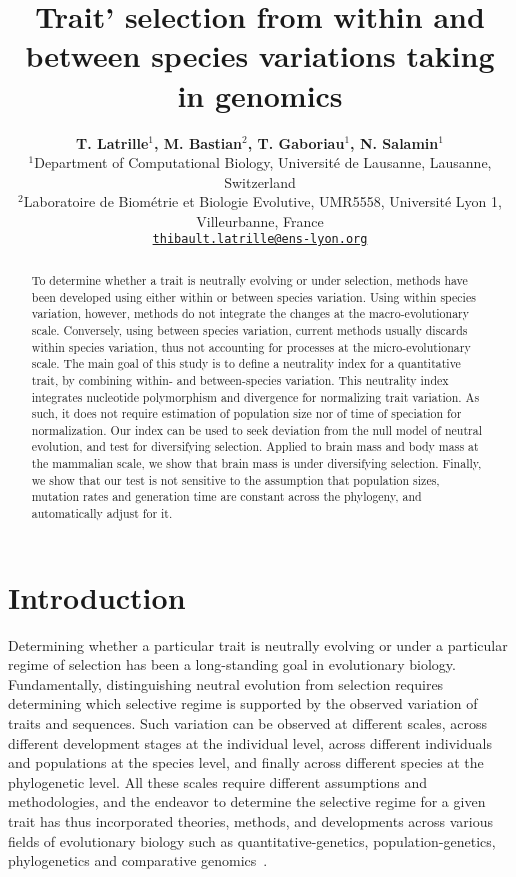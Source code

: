 \documentclass{article}
\title{Trait' selection from within and between species variations taking in genomics}
\author{
\large
\textbf{T. {Latrille}$^{1}$\orcidlink{0000-0002-9643-4668}, M. {Bastian}$^{2}$, T. {Gaboriau}$^{1}$\orcidlink{0000-0001-7530-2204}, N. {Salamin}$^{1}$\orcidlink{0000-0002-3963-4954}}\\
\normalsize
$^{1}$Department of Computational Biology, Université de Lausanne, Lausanne, Switzerland\\
$^{2}$Laboratoire de Biométrie et Biologie Evolutive, UMR5558, Université Lyon 1, Villeurbanne, France \\
\texttt{\href{mailto:thibault.latrille@ens-lyon.org}{thibault.latrille@ens-lyon.org}} \\
}
\begin{document}
\maketitle

\begin{abstract}
    To determine whether a trait is neutrally evolving or under selection, methods have been developed using either within or between species variation.
    Using within species variation, however, methods do not integrate the changes at the macro-evolutionary scale.
    Conversely, using between species variation, current methods usually discards within species variation, thus not accounting for processes at the micro-evolutionary scale.
    The main goal of this study is to define a neutrality index for a quantitative trait, by combining within- and between-species variation.
    This neutrality index integrates nucleotide polymorphism and divergence for normalizing trait variation.
    As such, it does not require estimation of population size nor of time of speciation for normalization.
    Our index can be used to seek deviation from the null model of neutral evolution, and test for diversifying selection.
    Applied to brain mass and body mass at the mammalian scale, we show that brain mass is under diversifying selection.
    Finally, we show that our test is not sensitive to the assumption that population sizes, mutation rates and generation time are constant across the phylogeny, and automatically adjust for it.
\end{abstract}


\section*{Introduction}\label{sec:introduction}

Determining whether a particular trait is neutrally evolving or under a particular regime of selection has been a long-standing goal in evolutionary biology.
Fundamentally, distinguishing neutral evolution from selection requires determining which selective regime is supported by the observed variation of traits and sequences.
Such variation can be observed at different scales, across different development stages at the individual level, across different individuals and populations at the species level, and finally across different species at the phylogenetic level.
All these scales require different assumptions and methodologies, and the endeavor to determine the selective regime for a given trait has thus incorporated theories, methods, and developments across various fields of evolutionary biology such as quantitative-genetics, population-genetics, phylogenetics and comparative genomics~\cite{lynch_genetics_1998, walsh_evolution_2018}.
\end{document}
